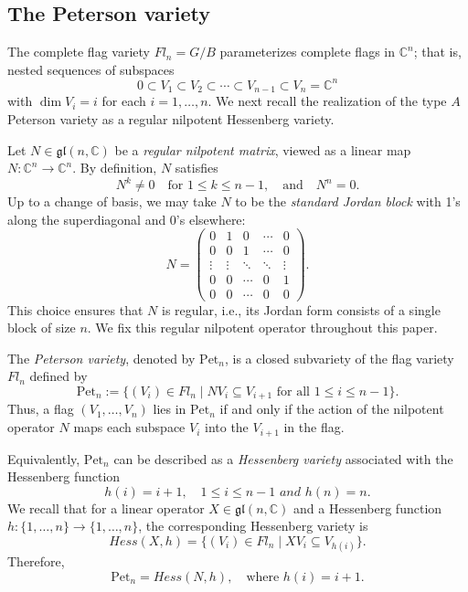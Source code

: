 \documentclass[12pt, reqno]{amsart}
\theoremstyle{plain}
\numberwithin{equation}{section}
\theoremstyle{definition}
\begin{document}
\subsection{The Peterson variety}
The complete flag variety $Fl_n = G / B$
parameterizes complete flags in $\mathbb{C}^n$; that is, nested sequences of subspaces
$$
0 \subset V_1 \subset V_2 \subset \cdots \subset V_{n-1} \subset V_n = \mathbb{C}^n
$$
with $\dim V_i = i$ for each $i = 1, \dots, n$. We next recall the realization of the type \(A\) Peterson variety as a
regular nilpotent Hessenberg variety. 

Let $N \in \mathfrak{gl}(n,\mathbb{C})$ be a \emph{regular nilpotent matrix}, viewed as a linear map  
$N : \mathbb{C}^n \to \mathbb{C}^n$. By definition, $N$ satisfies
$$
N^k \neq 0 \quad \text{for } 1 \le k \le n-1, 
\quad \text{and} \quad N^{n} = 0.
$$
Up to a change of basis, we may take $N$ to be the \emph{standard Jordan block} with 1’s along the superdiagonal and 0’s elsewhere:
$$
N = 
\begin{pmatrix}
0 & 1 & 0 & \cdots & 0 \\
0 & 0 & 1 & \cdots & 0 \\
\vdots & \vdots & \ddots & \ddots & \vdots \\
0 & 0 & \cdots & 0 & 1 \\
0 & 0 & \cdots & 0 & 0
\end{pmatrix}.
$$
This choice ensures that $N$ is regular, i.e., its Jordan form consists of a single block of size $n$. We fix this regular nilpotent operator throughout this paper.


The \emph{Peterson variety}, denoted by $\mathrm{Pet}_n$, is a closed subvariety of the flag variety $Fl_n$ defined by
$$
\mathrm{Pet}_n := \{ (V_i) \in Fl_n \mid N V_i \subseteq V_{i+1} \text{ for all } 1 \le i \le n-1 \}.
$$
Thus, a flag $(V_1, \dots, V_n)$ lies in $\mathrm{Pet}_n$ if and only if the action of the nilpotent operator $N$ maps each subspace $V_i$ into the $V_{i+1}$ in the flag.

Equivalently, $\mathrm{Pet}_n$ can be described as a \emph{Hessenberg variety} associated with the Hessenberg function
$$
h(i) = i + 1, \quad 1 \le i \le n-1 \,\, and \,\, h(n)=n.
$$
We recall that for a linear operator $X \in \mathfrak{gl}(n,\mathbb{C})$ and a Hessenberg function 
$h : \{1, \dots, n\} \to \{1, \dots, n\}$, the corresponding Hessenberg variety is
$$
Hess(X, h) = \{ (V_i) \in Fl_n \mid X V_i \subseteq V_{h(i)} \}.
$$
Therefore,
$$
\mathrm{Pet}_n = Hess(N, h), \quad \text{where } h(i) = i+1.
$$
\end{document}

